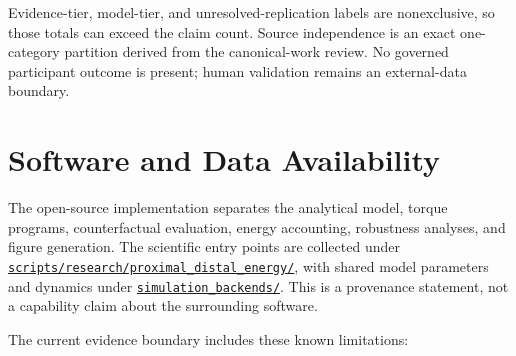 \documentclass[
  letterpaper,
]{report}
\begin{document}
Evidence-tier, model-tier, and unresolved-replication labels are
nonexclusive, so those totals can exceed the claim count. Source
independence is an exact one-category partition derived from the
canonical-work review. No governed participant outcome is present; human
validation remains an external-data boundary.

\chapter{Software and Data Availability}\label{sec-appendix-inventory}

The open-source implementation separates the analytical model, torque
programs, counterfactual evaluation, energy accounting, robustness
analyses, and figure generation. The scientific entry points are
collected under
\href{https://github.com/D-sorganization/UpstreamDrift/tree/main/scripts/research/proximal_distal_energy}{\texttt{scripts/research/proximal\_distal\_energy/}},
with shared model parameters and dynamics under
\href{https://github.com/D-sorganization/UpstreamDrift/tree/main/src/shared/python/simulation_backends}{\texttt{simulation\_backends/}}.
This is a provenance statement, not a capability claim about the
surrounding software.

The current evidence boundary includes these known limitations:
\end{document}
